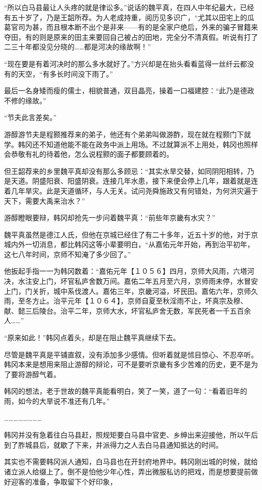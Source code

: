 “所以白马县最让人头疼的就是律讼多。”说话的魏平真，在四人中年纪最大，已经有五十岁了，乃是王韶所荐。为人老成持重，阅历见多识广，“尤其以田宅上的瓜葛官司为甚，而且根本断不出个是非来——有的是全家户绝后，外来的骗子冒籍来夺田，有的则是原来的田主来要回自己被占的田地，完全分不清真假。听说有打了二三十年都没见分晓的……都是河决的缘故啊！”

“现在要是有着河决时的那么多水就好了。”方兴却是在抬头看看蓝得一丝纤云都没有的天空，“有多长时间没下雨了。”

最后一名身矮而瘦的儒士，相貌普通，双目晶亮，操着一口福建腔：“此乃是德政不修的缘故。”

“节夫此言差矣。”

游醇游节夫是程颢推荐来的弟子，他还有个弟弟叫做游酢，现在就在程颢门下就学。韩冈还不知道他能不能在政务中派上用场。不过就算派不上用处，韩冈也照样会恭敬有礼的待着他，怎么说程颢的面子都要顾着的。

但王韶荐来的乡里魏平真却没有那么多顾忌：“其实水旱交替，如同阴阳相转，乃是天道。阴盛阳衰、阳盛阴衰。连接几年水患，接下来便会停上几年，跟着就是连着几年旱灾。此是天道循环，与人无关。试问尧舜施政又有何错处，为何洪灾遍于天下，需要大禹来治水？”

游醇瞪眼要辩，韩冈却抢先一步问着魏平真：“前些年京畿有水灾？”

魏平真虽然是德江人氏，但他在京城已经住了有二十多年，近五十岁的他，对于京城内外一切消息，都比韩冈这等小辈要明白，“从嘉佑元年开始，再到治平初年，这七八年时间，京师不知淹了多少回了。”

他扳起手指一一为韩冈数着：“嘉佑元年【１０５６】四月，京师大风雨，六塔河决，水注安上门，坏官私庐舍数万间。嘉佑二年五月至六月，京师雨未停，水冒安上门，门关折，城中系伐渡人。嘉佑三年，京畿河溢，坏民田。嘉佑六年，京师久雨，至冬方止。治平元年【１０６４】，京师自夏至秋淫雨不止，坏真宗及穆、献、懿三后陵台。治平二年，京师大水，坏官私庐舍无数，军民死者一千五百余人……”

“原来如此！”韩冈点着头，却是在阻止魏平真继续下去。

尽管是魏平真是平铺直叙，没有添加多少感情。但听着就是怵目惊心、不忍卒听。韩冈本来是想用来阻止游醇的辩论，可不是要听京畿有多少苦难的历史，更不是为了要将游醇气着。

韩冈的想法，老于世故的魏平真能看明白，笑了一笑，道了一句：“看着旧年的雨，如今的大旱说不准还有几年。”

……………………

韩冈并没有急着往白马县赶，照规矩要白马县中官吏、乡绅出来迎接他，所以午后到了胙城县后，就歇了下来，并派得力之人去白马县通知抵达的时间。

其实也不需要韩冈派人通知，白马县也在开封府地界中。韩冈刚出城的时候，就给诸立派人给缀上了。倒不是怕他少年心性，弄出微服私访的把戏，而是想要提前做好迎客的准备，争取留下个好印象，

